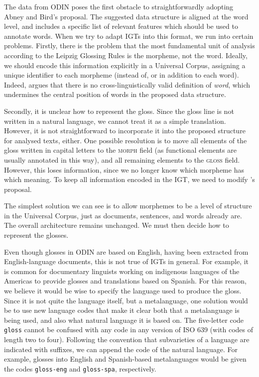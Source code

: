 The data from ODIN poses the first obstacle to straightforwardly adopting Abney and Bird's proposal. The suggested data structure is aligned at the word level, and includes a specific list of relevant features which should be used to annotate words. When we try to adapt IGTs into this format, we run into certain problems.  Firstly, there is the problem that the most fundamental unit of analysis according to the Leipzig Glossing Rules is the morpheme, not the word.  Ideally, we should encode this information explicitly in a Universal Corpus, assigning a unique identifier to each morpheme (instead of, or in addition to each word). Indeed,  argues that there is no cross-linguistically valid definition of \textit{word}, which undermines the central position of words in the proposed data structure.

Secondly, it is unclear how to represent the gloss.  Since the gloss line is not written in a natural language, we cannot treat it as a simple translation.  However, it is not straightforward to incorporate it into the proposed structure for analysed texts, either. One possible resolution is to move all elements of the gloss written in capital letters to the \textsc{morph} field (as functional elements are usually annotated in this way), and all remaining elements to the \textsc{gloss} field.  However, this loses information, since we no longer know which morpheme has which meaning.  To keep all information encoded in the IGT, we need to modify 's proposal.

The simplest solution we can see is to allow morphemes to be a level of structure in the Universal Corpus, just as documents, sentences, and words already are.  The overall architecture remains unchanged.  We must then decide how to represent the glosses.

Even though glosses in ODIN are based on English, having been extracted from English-language documents, this is not true of IGTs in general.  For example, it is common for documentary linguists working on indigenous languages of the Americas to provide glosses and translations based on Spanish.  For this reason, we believe it would be wise to specify the language used to produce the gloss.  Since it is not quite the language itself, but a metalanguage, one solution
would be to use new language codes that make it clear both that a metalanguage is being used, and also what natural language it is based on.  The five-letter code \texttt{gloss} cannot be confused with any code in any version of ISO 639 (with codes of length two to four).  Following the convention that subvarieties of a language are indicated with suffixes, we can append the code of the natural language.  For example, glosses into English and Spanish-based metalanguages would be given the codes \texttt{gloss-eng} and \texttt{gloss-spa}, respectively.

